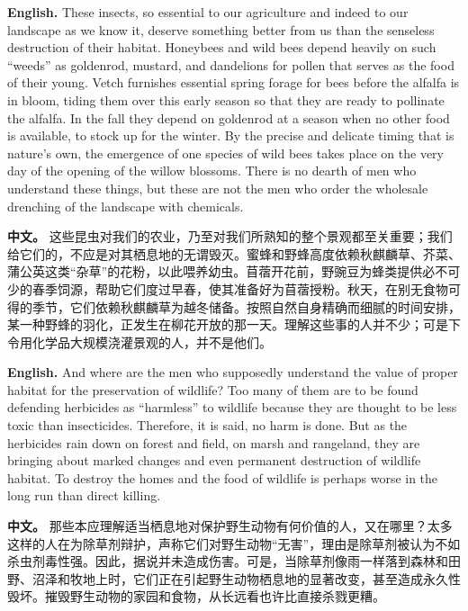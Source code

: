 \noindent\textbf{English.} These insects, so essential to our agriculture and indeed to our landscape as we know it, deserve something better from us than the senseless destruction of their habitat. Honeybees and wild bees depend heavily on such ``weeds'' as goldenrod, mustard, and dandelions for pollen that serves as the food of their young. Vetch furnishes essential spring forage for bees before the alfalfa is in bloom, tiding them over this early season so that they are ready to pollinate the alfalfa. In the fall they depend on goldenrod at a season when no other food is available, to stock up for the winter. By the precise and delicate timing that is nature's own, the emergence of one species of wild bees takes place on the very day of the opening of the willow blossoms. There is no dearth of men who understand these things, but these are not the men who order the wholesale drenching of the landscape with chemicals.
\par
\noindent\textbf{中文。} 这些昆虫对我们的农业，乃至对我们所熟知的整个景观都至关重要；我们给它们的，不应是对其栖息地的无谓毁灭。蜜蜂和野蜂高度依赖秋麒麟草、芥菜、蒲公英这类“杂草”的花粉，以此喂养幼虫。苜蓿开花前，野豌豆为蜂类提供必不可少的春季饲源，帮助它们度过早春，使其准备好为苜蓿授粉。秋天，在别无食物可得的季节，它们依赖秋麒麟草为越冬储备。按照自然自身精确而细腻的时间安排，某一种野蜂的羽化，正发生在柳花开放的那一天。理解这些事的人并不少；可是下令用化学品大规模浇灌景观的人，并不是他们。
\par\medskip

\noindent\textbf{English.} And where are the men who supposedly understand the value of proper habitat for the preservation of wildlife? Too many of them are to be found defending herbicides as ``harmless'' to wildlife because they are thought to be less toxic than insecticides. Therefore, it is said, no harm is done. But as the herbicides rain down on forest and field, on marsh and rangeland, they are bringing about marked changes and even permanent destruction of wildlife habitat. To destroy the homes and the food of wildlife is perhaps worse in the long run than direct killing.
\par
\noindent\textbf{中文。} 那些本应理解适当栖息地对保护野生动物有何价值的人，又在哪里？太多这样的人在为除草剂辩护，声称它们对野生动物“无害”，理由是除草剂被认为不如杀虫剂毒性强。因此，据说并未造成伤害。可是，当除草剂像雨一样落到森林和田野、沼泽和牧地上时，它们正在引起野生动物栖息地的显著改变，甚至造成永久性毁坏。摧毁野生动物的家园和食物，从长远看也许比直接杀戮更糟。
\par\medskip

